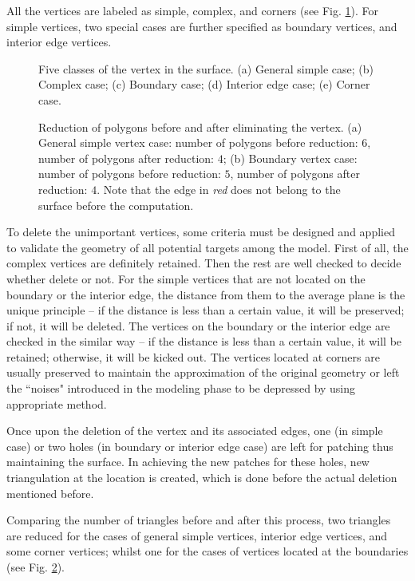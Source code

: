 All the vertices are labeled as simple, complex, and corners (see Fig. \ref{fig:FiveClasses}).
For simple vertices, two special cases are further specified as boundary vertices, and interior edge vertices.
\begin{figure}[t]
\centering
\subfloat[]{

\label{fig:GeneralSimple}
}
\hfil
\subfloat[]{

\label{fig:Complex}
}
\hfil
\subfloat[]{

\label{fig:Boundary}
}
\hfil
\subfloat[]{

\label{fig:InteriorEdge}
}
\hfil
\subfloat[]{

\label{fig:Corner}
}
\caption{Five classes of the vertex in the surface. (a) General simple case; (b) Complex case; (c) Boundary case; (d) Interior edge case; (e) Corner case. }%
\label{fig:FiveClasses}
\end{figure}
\begin{figure}[t]
\centering
\subfloat[]{

\label{fig:SimpleReduction}
}
\hfil
\subfloat[]{

\label{fig:BoundaryReduction}
}
\caption{Reduction of polygons before and after eliminating the vertex. (a) General simple vertex case: number of polygons before reduction: $6$, number of polygons after reduction: $4$; (b) Boundary vertex case: number of polygons before reduction: $5$, number of polygons after reduction: $4$. Note that the edge in \emph{red} does not belong to the surface before the computation. }%
\label{fig:Reduction}
\end{figure}

To delete the unimportant vertices, some criteria must be designed and applied to validate the geometry of all potential targets among the model.
First of all, the complex vertices are definitely retained.
Then the rest are well checked to decide whether delete or not.
For the simple vertices that are not located on the boundary or the interior edge, the distance from them to the average plane is the unique principle -- if the distance is less than a certain value, it will be preserved; if not, it will be deleted. %
The vertices on the boundary or the interior edge are checked in the similar way -- if the distance is less than a certain value, it will be retained; otherwise, it will be kicked out. %
The vertices located at corners are usually preserved to maintain the approximation of the original geometry or left the ``noises" introduced in the modeling phase to be depressed by using appropriate method. %

Once upon the deletion of the vertex and its associated edges, one (in simple case) or two holes (in boundary or interior edge case) are left for patching thus maintaining the surface. In achieving the new patches for these holes, new triangulation at the location is created, which is done before the actual deletion mentioned before.

Comparing the number of triangles before and after this process, two triangles are reduced for the cases of general simple vertices, interior edge vertices, and some corner vertices; whilst one for the cases of vertices located at the boundaries (see Fig. \ref{fig:Reduction}). %
